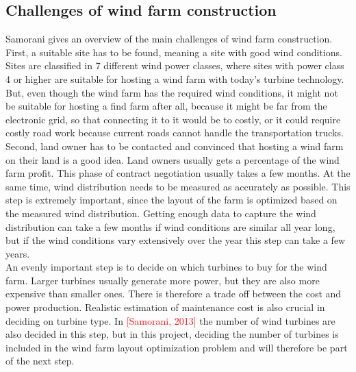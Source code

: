 \subsection{Challenges of wind farm construction}
Samorani gives an overview of the main challenges of wind farm construction. First, a suitable site has to be found, meaning a site with good wind conditions. Sites are classified in 7 different wind power classes, where sites with power class 4 or higher are suitable for hosting a wind farm with today's turbine technology. But, even though the wind farm has the required wind conditions, it might not be suitable for hosting a find farm after all, because it might be far from the electronic grid, so that connecting it to it would be to costly, or it could require costly road work because current roads cannot handle the transportation trucks.\\

\noindent Second, land owner has to be contacted and convinced that hosting a wind farm on their land is a good idea. Land owners usually gets a percentage of the wind farm profit. This phase of contract negotiation  usually takes a few months. At the same time, wind distribution needs to be measured as accurately as possible. This step is extremely important, since the layout of the farm is optimized based on the measured wind distribution. Getting enough data to capture the wind distribution can take a few months if wind conditions are similar all year long, but if the wind conditions vary extensively over the year this step can take a few years. \\

\noindent An evenly important step is to decide on which turbines to buy for the wind farm. Larger turbines usually generate more power, but they are also more expensive than smaller ones. There is therefore a trade off between the cost and power production. Realistic estimation of maintenance cost is also crucial in deciding on turbine type. In \textcolor{red}{[Samorani, 2013]} the number of wind turbines are also decided in this step, but in this project, deciding the number of turbines is included in the wind farm layout optimization problem and will therefore be part of the next step. \\

